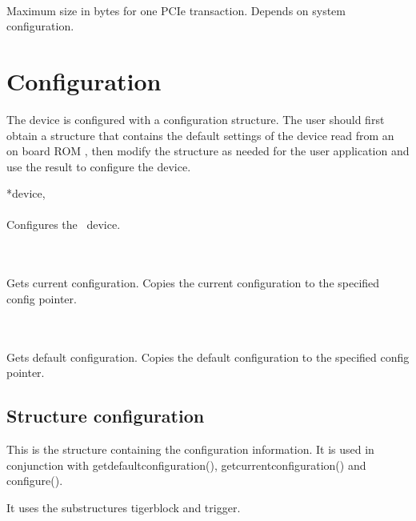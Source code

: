 			\\
			Maximum size in bytes for one PCIe transaction. Depends on system configuration.\par

	\section{Configuration}

		The device is configured with a configuration structure. 
		The user should first obtain a structure that contains the default settings of the device read from an on board ROM , 
		then modify the structure as needed for the user application and use the result to configure the device.\par

		 {*device,} \\ \\
		Configures the \deviceName\ device.\par

		 \\ \\
		Gets current configuration. Copies the current configuration to the specified config pointer.\par

		 \\ \\
		Gets default configuration. Copies the default configuration to the specified config pointer.\par

		\subsection{Structure \prefix configuration}

			This is the structure containing the configuration information. It is used in conjunction with \textsf{\prefix get\tu default\tu configuration()}, \textsf{\prefix get\tu current\tu configuration()} and \textsf{\prefix configure()}.\par

			It uses the substructures \textsf{\prefix tiger\tu block} and \textsf{\prefix trigger}.\par

